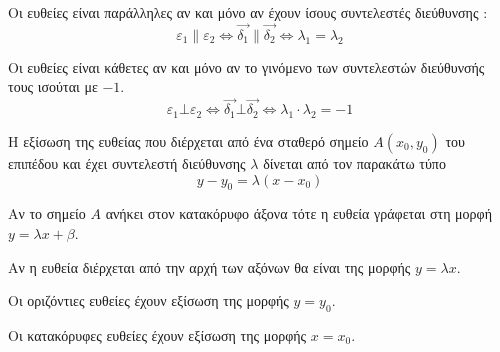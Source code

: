 \documentclass[twoside,nofonts,internet,shmeiwseis]{thewria}
\begin{document}
\begin{rlist}
\item Οι ευθείες είναι παράλληλες αν και μόνο αν έχουν ίσους συντελεστές διεύθυνσης :  \[ \varepsilon_1\parallel\varepsilon_2\Leftrightarrow\vec{\delta_1}\parallel\vec{\delta_2}\Leftrightarrow\lambda_1=\lambda_2 \]
\item Οι ευθείες είναι κάθετες αν και μόνο αν το γινόμενο των συντελεστών διεύθυνσής τους ισούται με $ -1 $.
\[ \varepsilon_1\bot\varepsilon_2\Leftrightarrow\vec{\delta_1}\bot\vec{\delta_2}\Leftrightarrow\lambda_1\cdot\lambda_2=-1 \]
\end{rlist}
Η εξίσωση της ευθείας που διέρχεται από ένα σταθερό σημείο $ A(x_0,y_0) $ του επιπέδου και έχει συντελεστή διεύθυνσης $ \lambda $ δίνεται από τον παρακάτω τύπο
\[ y-y_0=\lambda(x-x_0) \]
\begin{rlist}
\item Αν το σημείο $ A $ ανήκει στον κατακόρυφο άξονα τότε η ευθεία γράφεται στη μορφή $ y=\lambda x+\beta $.
\item Αν η ευθεία διέρχεται από την αρχή των αξόνων θα είναι της μορφής $ y=\lambda x $.
\item Οι οριζόντιες ευθείες έχουν εξίσωση της μορφής $ y=y_0 $.
\item Οι κατακόρυφες ευθείες έχουν εξίσωση της μορφής $ x=x_0 $.
\end{rlist}
\end{document}
